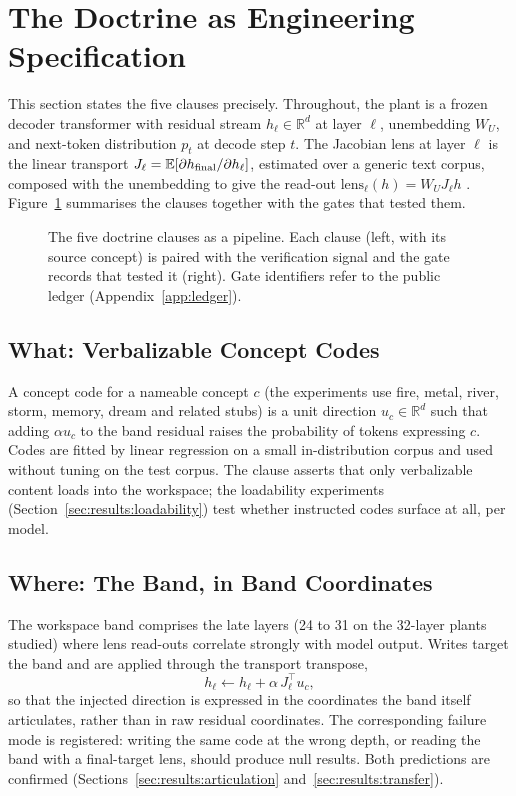 \section{The Doctrine as Engineering Specification}
\label{sec:doctrine}

This section states the five clauses precisely. Throughout, the plant is a frozen decoder transformer with residual stream $h_\ell \in \mathbb{R}^{d}$ at layer $\ell$, unembedding $W_U$, and next-token distribution $p_t$ at decode step $t$. The Jacobian lens at layer $\ell$ is the linear transport $J_\ell = \mathbb{E}\!\left[\partial h_{\mathrm{final}} / \partial h_\ell\right]$, estimated over a generic text corpus, composed with the unembedding to give the read-out $\mathrm{lens}_\ell(h) = W_U J_\ell h$ \cite{JacobianLens2026}. Figure~\ref{fig:doctrine} summarises the clauses together with the gates that tested them.

\begin{figure}[t]
\centering
\resizebox{\columnwidth}{!}{}
\caption{The five doctrine clauses as a pipeline. Each clause (left, with its source concept) is paired with the verification signal and the gate records that tested it (right). Gate identifiers refer to the public ledger (Appendix~\ref{app:ledger}).}
\label{fig:doctrine}
\end{figure}

\subsection{What: Verbalizable Concept Codes}

A concept code for a nameable concept $c$ (the experiments use fire, metal, river, storm, memory, dream and related stubs) is a unit direction $u_c \in \mathbb{R}^{d}$ such that adding $\alpha u_c$ to the band residual raises the probability of tokens expressing $c$. Codes are fitted by linear regression on a small in-distribution corpus and used without tuning on the test corpus. The clause asserts that only verbalizable content loads into the workspace; the loadability experiments (Section~\ref{sec:results:loadability}) test whether instructed codes surface at all, per model.

\subsection{Where: The Band, in Band Coordinates}

The workspace band comprises the late layers (24 to 31 on the 32-layer plants studied) where lens read-outs correlate strongly with model output. Writes target the band and are applied through the transport transpose,
\begin{equation}
h_\ell \leftarrow h_\ell + \alpha \, J_\ell^{\top} u_c,
\label{eq:write}
\end{equation}
so that the injected direction is expressed in the coordinates the band itself articulates, rather than in raw residual coordinates. The corresponding failure mode is registered: writing the same code at the wrong depth, or reading the band with a final-target lens, should produce null results. Both predictions are confirmed (Sections~\ref{sec:results:articulation} and~\ref{sec:results:transfer}).

